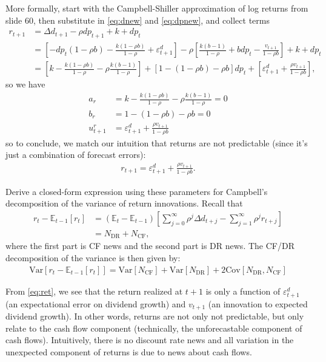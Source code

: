 More formally, start with the Campbell-Shiller approximation of log returns from slide 60, then substitute in \eqref{eq:dnew} and \eqref{eq:dpnew}, and collect terms
\begin{align}
r_{t+1}	&=\Delta d_{t+1}-\rho dp_{t+1}+k+dp_{t} \\
	&=\left[-dp_{t}(1-\rho b)-\frac{k(1-\rho b)}{1-\rho}+\varepsilon_{t+1}^{d}\right]-\rho\left[\frac{k(b-1)}{1-\rho}+bdp_{t}-\frac{v_{t+1}}{1-\rho b}\right]+k+dp_{t} \\
	&=\left[k-\frac{k(1-\rho b)}{1-\rho}-\rho\frac{k(b-1)}{1-\rho}\right]+\left[1-(1-\rho b)-\rho b\right]dp_{t}+\left[\varepsilon_{t+1}^{d}+\frac{\rho v_{t+1}}{1-\rho b}\right],
\end{align}
so we have
\begin{align}
    a_{r}	&=k-\frac{k(1-\rho b)}{1-\rho}-\rho\frac{k(b-1)}{1-\rho}=0 \\
    b_{r}	&=1-(1-\rho b)-\rho b=0 \\
    u_{t+1}^{r}	&=\varepsilon_{t+1}^{d}+\frac{\rho v_{t+1}}{1-\rho b}
\end{align}
so to conclude, we match our intuition that returns are not predictable (since it's just a combination of forecast errors):
\begin{align}
r_{t+1}=\varepsilon_{t+1}^{d}+\frac{\rho v_{t+1}}{1-\rho b}. \label{eq:ret}
\end{align}


\begin{answer}[Part f]
Derive a closed-form expression using these parameters for Campbell’s decomposition of the variance of return innovations. Recall that
\begin{align}
    r_t - \mathbb{E}_{t-1}[r_t] &= ( \mathbb{E}_t - \mathbb{E}_{t-1})
    \left[ \sum_{j=0}^{\infty} \rho^j \Delta d_{t+j} - \sum_{j=1}^\infty \rho^j r_{t+j} \right] \\
    &= N_{\text{DR}} + N_{\text{CF}},
\end{align}
where the first part is CF news and the second part is DR news. The CF/DR decomposition of the variance is then given by:
\begin{align}
    \text{Var} [r_t - \mathbb{E}_{t-1} [r_t]] = \text{Var}[N_{\text{CF}}] + \text{Var} [N_{\text{DR}}] + 2\text{Cov}[N_{\text{DR}},N_{\text{CF}}]
\end{align}
\end{answer}
From \eqref{eq:ret}, we see that the return realized at $t+1$ is only a function of $\varepsilon_{t+1}^d$ (an expectational error on dividend growth) and $v_{t+1}$ (an innovation to expected dividend growth). In other words, returns are not only not predictable, but only relate to the cash flow component (technically, the unforecastable component of cash flows). Intuitively, there is no discount rate news and all variation in the unexpected component of returns is due to news about cash flows.

